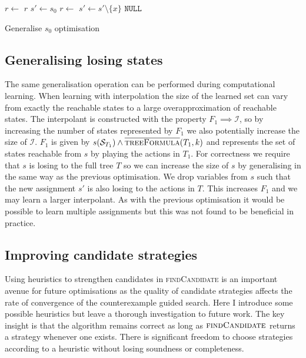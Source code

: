 \begin{algorithm}
    \begin{algorithmic}
            \State $r \gets $ 
             \Return $r$ \EndIIf
            \State $s' \gets s_0$
            \State $r \gets$  
                    \State $s' \gets s' \setminus \{x\}$ 
                \EndIf 
            \EndFor
            \State \Return $\texttt{NULL}$
        \EndFunction
    \end{algorithmic}
    \caption{Generalise $s_0$ optimisation}
    \label{alg:opt1}
\end{algorithm}

\subsection{Generalising losing states}

The same generalisation operation can be performed during computational learning. When learning with interpolation the size of the learned set can vary from exactly the reachable states to a large overapproximation of reachable states. The interpolant is constructed with the property $F_1 \implies \mathcal{I}$, so by increasing the number of states represented by $F_1$ we also potentially increase the size of $\mathcal{I}$. $F_1$ is given by $s(\mathcal{S}_{T_1}) \land \textsc{$\overline{\mbox{treeFormula}}$}(T_1, k)$ and represents the set of states reachable from $s$ by playing the actions in $T_1$. For correctness we require that $s$ is losing to the full tree $T$ so we can increase the size of $s$ by generalising in the same way as the previous optimisation. We drop variables from $s$ such that the new assignment $s'$ is also losing to the actions in $T$. This increases $F_1$ and we may learn a larger interpolant. As with the previous optimisation it would be possible to learn multiple assignments but this was not found to be beneficial in practice.

\subsection{Improving candidate strategies}

Using heuristics to strengthen candidates in \textsc{findCandidate} is an important avenue for future optimisations as the quality of candidate strategies affects the rate of convergence of the counterexample guided search. Here I introduce some possible heuristics but leave a thorough investigation to future work. The key insight is that the algorithm remains correct as long as $\textsc{findCandidate}$ returns a strategy whenever one exists. There is significant freedom to choose strategies according to a heuristic without losing soundness or completeness.

